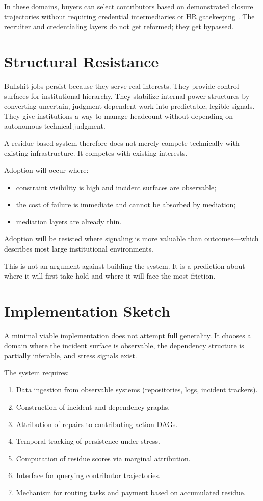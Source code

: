 \documentclass[12pt]{article}
\begin{document}
In these domains, buyers can select contributors based on demonstrated
closure trajectories without requiring credential intermediaries or HR
gatekeeping \cite{coase1937,williamson1985}. The recruiter and
credentialing layers do not get reformed; they get bypassed.

\section{Structural Resistance}

Bullshit jobs persist because they serve real interests. They provide
control surfaces for institutional hierarchy. They stabilize internal
power structures by converting uncertain, judgment-dependent work into
predictable, legible signals. They give institutions a way to manage
headcount without depending on autonomous technical judgment.

A residue-based system therefore does not merely compete technically
with existing infrastructure. It competes with existing interests.

Adoption will occur where:
\begin{itemize}
  \item constraint visibility is high and incident surfaces are
    observable;
  \item the cost of failure is immediate and cannot be absorbed by
    mediation;
  \item mediation layers are already thin.
\end{itemize}

Adoption will be resisted where signaling is more valuable than
outcomes---which describes most large institutional environments.

This is not an argument against building the system. It is a prediction
about where it will first take hold and where it will face the most
friction.

\section{Implementation Sketch}

A minimal viable implementation does not attempt full generality. It
chooses a domain where the incident surface is observable, the
dependency structure is partially inferable, and stress signals exist.

The system requires:
\begin{enumerate}
  \item Data ingestion from observable systems (repositories, logs,
    incident trackers).
  \item Construction of incident and dependency graphs.
  \item Attribution of repairs to contributing action DAGs.
  \item Temporal tracking of persistence under stress.
  \item Computation of residue scores via marginal attribution.
  \item Interface for querying contributor trajectories.
  \item Mechanism for routing tasks and payment based on accumulated
    residue.
\end{enumerate}
\end{document}
